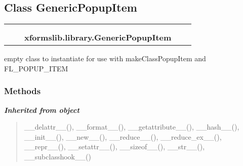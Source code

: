 

\subsection{Class GenericPopupItem}

    \label{xformslib:library:GenericPopupItem}
\begin{tabular}{cccccc}
\multicolumn{2}{r}{\settowidth{\BCL}{object}\multirow{2}{\BCL}{object}}
&&
  \\\cline{3-3}
  &&\multicolumn{1}{c|}{}
&&
  \\
&&\multicolumn{2}{l}{\textbf{xformslib.library.GenericPopupItem}}
\end{tabular}

empty class to instantiate for use with makeClassPopupItem and 
FL\_POPUP\_ITEM



  \subsubsection{Methods}


\large{\textbf{\textit{Inherited from object}}}

\begin{quote}
\_\_delattr\_\_(), \_\_format\_\_(), \_\_getattribute\_\_(), \_\_hash\_\_(), \_\_init\_\_(), \_\_new\_\_(), \_\_reduce\_\_(), \_\_reduce\_ex\_\_(), \_\_repr\_\_(), \_\_setattr\_\_(), \_\_sizeof\_\_(), \_\_str\_\_(), \_\_subclasshook\_\_()
\end{quote}


